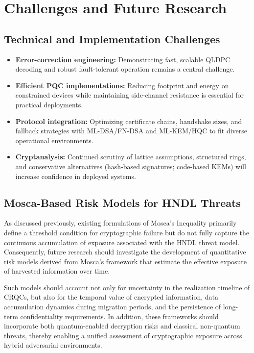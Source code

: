 \documentclass[11pt,a4paper]{article}
\begin{document}
\section{Challenges and Future Research}

\subsection{Technical and Implementation Challenges}
\begin{itemize}[leftmargin=*]
  \item \textbf{Error-correction engineering:} Demonstrating fast, scalable QLDPC decoding and robust fault-tolerant operation remains a central challenge.\cite{webster2026}
  \item \textbf{Efficient PQC implementations:} Reducing footprint and energy on constrained devices while maintaining side-channel resistance is essential for practical deployments.\cite{nist203,nist204,nist205}
  \item \textbf{Protocol integration:} Optimizing certificate chains, handshake sizes, and fallback strategies with ML-DSA/FN-DSA and ML-KEM/HQC to fit diverse operational environments.\cite{fips206status,nistpqc}
  \item \textbf{Cryptanalysis:} Continued scrutiny of lattice assumptions, structured rings, and conservative alternatives (hash-based signatures; code-based KEMs) will increase confidence in deployed systems.\cite{nist205,nistpqc}
\end{itemize}

\subsection{Mosca-Based Risk Models for HNDL Threats}

As discussed previously, existing formulations of Mosca’s Inequality primarily define a threshold condition for cryptographic failure but do not fully capture the continuous accumulation of exposure associated with the HNDL threat model. Consequently, future research should investigate the development of quantitative risk models derived from Mosca’s framework that estimate the effective exposure of harvested information over time.

Such models should account not only for uncertainty in the realization timeline of CRQCs, but also for the temporal value of encrypted information, data accumulation dynamics during migration periods, and the persistence of long-term confidentiality requirements. In addition, these frameworks should incorporate both quantum-enabled decryption risks and classical non-quantum threats, thereby enabling a unified assessment of cryptographic exposure across hybrid adversarial environments.
\end{document}
